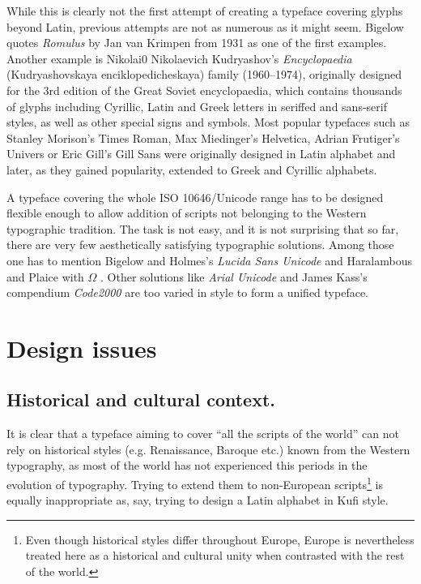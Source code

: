 \documentclass[english]{eurotex2003}
\begin{document}
While this is clearly not the first attempt of creating a typeface
covering glyphs beyond Latin, previous attempts are not as numerous as
it might seem. Bigelow \cite{Bigelow:1993} quotes \emph{Romulus} by
Jan van Krimpen from 1931 as one of the first examples. Another
example is {\cyr Niko\-lai0 Nikolaevich Kudryashov}'s
\emph{Encyclopaedia} ({\cyr Kud\-rya\-shov\-ska\-ya enciklo\-pedi\-cheskaya})
family (1960--1974), originally designed for the 3rd edition of the
Great Soviet encyclopaedia, which contains thousands of glyphs
including Cyrillic, Latin and Greek letters in seriffed and sans-serif
styles, as well as other special signs and symbols. Most popular
typefaces such as Stanley Morison's Times Roman, Max Miedinger's
Helvetica, Adrian Frutiger's Univers or Eric Gill's Gill Sans were
originally designed in Latin alphabet and later, as they gained
popularity, extended to Greek and Cyrillic alphabets.

A typeface covering the whole ISO 10646/Unicode range has to be
designed flexible enough to allow addition of scripts not belonging to
the Western typographic tradition. The task is not easy, and it is not
surprising that so far, there are very few aesthetically satisfying
typographic solutions. Among those one has to mention Bigelow and
Holmes's \emph{Lucida Sans Unicode} \cite{Bigelow:1993} and
Haralambous and Plaice with $\Omega$ \cite{Haralambous:1994}. Other
solutions like \emph{Arial Unicode} \cite{ArialUnicode} and James
Kass's compendium \emph{Code2000} \cite{Code2000} are too varied in
style to form a unified typeface.

\section{Design issues}

\subsection{Historical and cultural context.}

It is clear that a typeface aiming to cover ``all the scripts of the
world'' can not rely on historical styles (e.g. Renaissance, Baroque
etc.) known from the Western typography, as most of the world has not
experienced this periods in the evolution of typography. Trying to
extend them to non-European scripts\footnote{Even though historical
styles differ throughout Europe, Europe is nevertheless treated here
as a historical and cultural unity when contrasted with the rest of
the world.} is equally inappropriate as, say, trying to design a Latin
alphabet in Kufi style.
\end{document}
